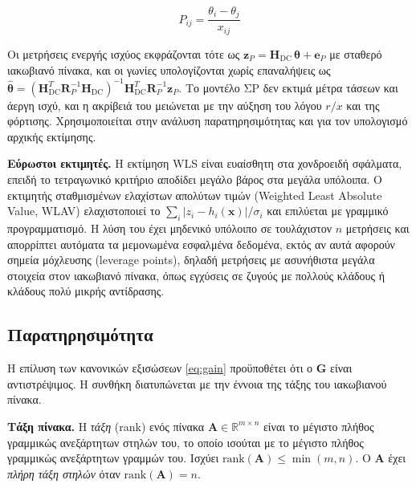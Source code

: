 \begin{equation}
P_{ij} = \frac{\theta_i - \theta_j}{x_{ij}}
\label{eq:dcflow}
\end{equation}

Οι μετρήσεις ενεργής ισχύος εκφράζονται τότε ως $\mathbf{z}_P = \mathbf{H}_{\mathrm{DC}}\,
\boldsymbol{\theta} + \mathbf{e}_P$ με σταθερό ιακωβιανό πίνακα, και οι γωνίες υπολογίζονται χωρίς
επαναλήψεις ως $\hat{\boldsymbol{\theta}} = (\mathbf{H}_{\mathrm{DC}}^{T}\mathbf{R}_P^{-1}
\mathbf{H}_{\mathrm{DC}})^{-1}\mathbf{H}_{\mathrm{DC}}^{T}\mathbf{R}_P^{-1}\mathbf{z}_P$. Το
μοντέλο ΣΡ δεν εκτιμά μέτρα τάσεων και άεργη ισχύ, και η ακρίβειά του μειώνεται με την αύξηση
του λόγου $r/x$ και της φόρτισης. Χρησιμοποιείται στην ανάλυση παρατηρησιμότητας και για
τον υπολογισμό αρχικής εκτίμησης.

\textbf{Εύρωστοι εκτιμητές.} Η εκτίμηση WLS είναι ευαίσθητη στα χονδροειδή σφάλματα, επειδή
το τετραγωνικό κριτήριο αποδίδει μεγάλο βάρος στα μεγάλα υπόλοιπα. Ο εκτιμητής σταθμισμένων
ελαχίστων απολύτων τιμών (Weighted Least Absolute Value, WLAV) ελαχιστοποιεί το
$\sum_{i} |z_i - h_i(\mathbf{x})|/\sigma_i$ και επιλύεται με γραμμικό προγραμματισμό. Η λύση του έχει μηδενικό υπόλοιπο σε τουλάχιστον $n$ μετρήσεις και απορρίπτει αυτόματα τα μεμονωμένα εσφαλμένα
δεδομένα, εκτός αν αυτά αφορούν σημεία μόχλευσης (leverage points), δηλαδή μετρήσεις με
ασυνήθιστα μεγάλα στοιχεία στον ιακωβιανό πίνακα, όπως εγχύσεις σε ζυγούς με πολλούς κλάδους ή
κλάδους πολύ μικρής αντίδρασης.

\subsection{Παρατηρησιμότητα}
\label{sec:observability}

Η επίλυση των κανονικών εξισώσεων \eqref{eq:gain} προϋποθέτει ότι ο $\mathbf{G}$ είναι
αντιστρέψιμος. Η συνθήκη διατυπώνεται με την έννοια της τάξης του ιακωβιανού πίνακα.

\textbf{Τάξη πίνακα.} Η \emph{τάξη} (rank) ενός πίνακα $\mathbf{A} \in \mathbb{R}^{m \times n}$
είναι το μέγιστο πλήθος γραμμικώς ανεξάρτητων στηλών του, το οποίο ισούται με το μέγιστο
πλήθος γραμμικώς ανεξάρτητων γραμμών του. Ισχύει $\mathrm{rank}(\mathbf{A}) \le \min(m, n)$. Ο $\mathbf{A}$
έχει \emph{πλήρη τάξη στηλών} όταν $\mathrm{rank}(\mathbf{A}) = n$.

